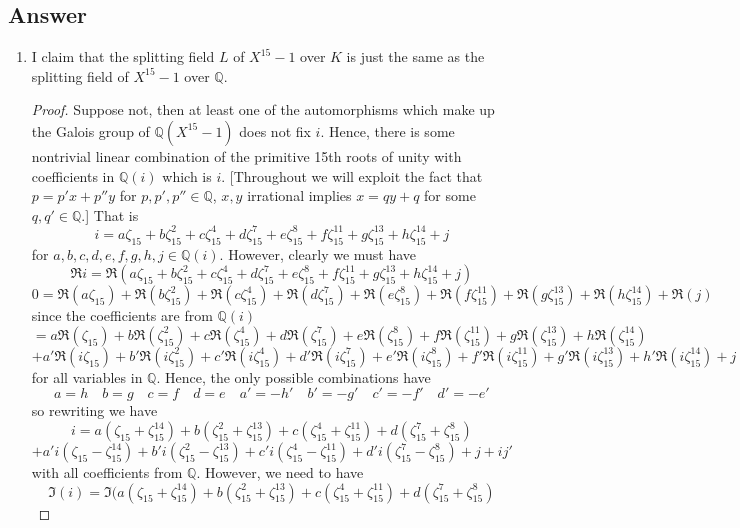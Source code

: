 \documentclass[11pt]{article}
\begin{document}
\subsection{Answer}
\begin{enumerate}
\item I claim that the splitting field $L$ of $X^15-1$ over $K$ is just the same as the splitting field of $X^{15} -1$ over $\mathbb{Q}$. 
\begin{proof}
Suppose not, then at least one of the automorphisms which make up the Galois group of $\mathbb{Q}(X^{15}-1)$ does not fix $i$. Hence, there is some nontrivial linear combination of the primitive 15th roots of unity with coefficients in $\mathbb{Q}(i)$ which is $i$. [Throughout we will exploit the fact that $p = p' x+p''y$ for $p,p',p'' \in \mathbb{Q}$, $x, y $ irrational implies $x= q y+q$ for some $q,q' \in \mathbb{Q}$.]  That is
\[i = a\zeta_{15}+ b\zeta_{15}^2 +c\zeta_{15}^4+d\zeta_{15}^7+e\zeta_{15}^8+f\zeta_{15}^{11}+g\zeta_{15}^{13}+h\zeta_{15}^{14}+j\]
for $a,b,c,d,e,f,g,h,j\in\mathbb{Q}(i)$. However, clearly we must have
\[\Re i = \Re\left(a\zeta_{15}+ b\zeta_{15}^2 +c\zeta_{15}^4+d\zeta_{15}^7+e\zeta_{15}^8+f\zeta_{15}^{11}+g\zeta_{15}^{13}+h\zeta_{15}^{14}+j\right)\] 
\[0= \Re (a\zeta_{15})+ \Re (b\zeta_{15}^2 )+\Re (c\zeta_{15}^4)+\Re (d\zeta_{15}^7)+\Re (e\zeta_{15}^8)+\Re (f\zeta_{15}^{11})+\Re (g\zeta_{15}^{13})+\Re (h\zeta_{15}^{14})+\Re (j)\] 
since the coefficients are from $\mathbb{Q}(i)$
\[= a \Re (\zeta_{15})+  b \Re (\zeta_{15}^2 )+ c \Re (\zeta_{15}^4)+ d \Re (\zeta_{15}^7)+ e \Re (\zeta_{15}^8)+ f \Re (\zeta_{15}^{11})+ g \Re (\zeta_{15}^{13})+ h \Re (\zeta_{15}^{14})\] 
\[+ a' \Re (i \zeta_{15})+  b' \Re (i \zeta_{15}^2 )+ c' \Re (i \zeta_{15}^4)+ d' \Re (i \zeta_{15}^7)+ e' \Re (i \zeta_{15}^8)+ f' \Re (i \zeta_{15}^{11})+ g' \Re (i \zeta_{15}^{13})+ h' \Re (i \zeta_{15}^{14})+j\] 
for all variables in $\mathbb{Q}$.
Hence, the only possible combinations have 
\[a = h\quad b=g \quad c = f \quad d = e \quad a' = -h'\quad b'=-g' \quad c' = -f' \quad d' = -e'\]
so rewriting we have
\[ i = a  (\zeta_{15} +  \zeta_{15}^{14} ) +  b(   \zeta_{15}^2 +   \zeta_{15}^{13}) + c  (\zeta_{15}^4+   \zeta_{15}^{11} )+ d ( \zeta_{15}^7+  \zeta_{15}^8)\] 
\[+ a' i ( \zeta_{15} -   \zeta_{15}^{14})+  b'  i( \zeta_{15}^2 -  \zeta_{15}^{13} ) + c'  i (\zeta_{15}^4 -  \zeta_{15}^{11})+ d'  i( \zeta_{15}^7 - \zeta_{15}^8 )+j + i j'\] 
with all coefficients from $\mathbb{Q}.$ However, we need to have
\[ \Im (i) = \Im(  a  (\zeta_{15} +  \zeta_{15}^{14} ) +  b(   \zeta_{15}^2 +   \zeta_{15}^{13}) + c  (\zeta_{15}^4+   \zeta_{15}^{11} )+ d ( \zeta_{15}^7+  \zeta_{15}^8)\] 

\end{proof}
\end{enumerate}
\end{document}
